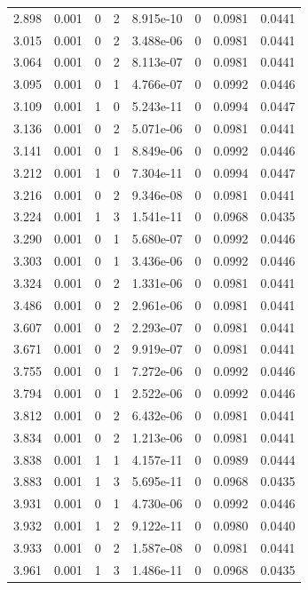 \documentclass[preview]{standalone}
\begin{document}
{{{\begin{tabular}{L{1.2cm}C{1.2cm} C{0.3cm}C{0.5cm} C{1.4cm}C{1.4cm} C{1.4cm}C{1.4cm}}
  2.898  &  0.001  & 0     &  2 &  8.915e-10  & 0  & 0.0981 &  0.0441   \\ 
  3.015  &  0.001  & 0     &  2 &  3.488e-06  & 0  & 0.0981 &  0.0441   \\ 
  3.064  &  0.001  & 0     &  2 &  8.113e-07  & 0  & 0.0981 &  0.0441   \\ 
  3.095  &  0.001  & 0     &  1 &  4.766e-07  & 0  & 0.0992 &  0.0446   \\ 
  3.109  &  0.001  & 1     &  0 &  5.243e-11  & 0  & 0.0994 &  0.0447   \\ 
  3.136  &  0.001  & 0     &  2 &  5.071e-06  & 0  & 0.0981 &  0.0441   \\ 
  3.141  &  0.001  & 0     &  1 &  8.849e-06  & 0  & 0.0992 &  0.0446   \\ 
  3.212  &  0.001  & 1     &  0 &  7.304e-11  & 0  & 0.0994 &  0.0447   \\ 
  3.216  &  0.001  & 0     &  2 &  9.346e-08  & 0  & 0.0981 &  0.0441   \\ 
  3.224  &  0.001  & 1     &  3 &  1.541e-11  & 0  & 0.0968 &  0.0435   \\ 
  3.290  &  0.001  & 0     &  1 &  5.680e-07  & 0  & 0.0992 &  0.0446   \\ 
  3.303  &  0.001  & 0     &  1 &  3.436e-06  & 0  & 0.0992 &  0.0446   \\ 
  3.324  &  0.001  & 0     &  2 &  1.331e-06  & 0  & 0.0981 &  0.0441   \\ 
  3.486  &  0.001  & 0     &  2 &  2.961e-06  & 0  & 0.0981 &  0.0441   \\ 
  3.607  &  0.001  & 0     &  2 &  2.293e-07  & 0  & 0.0981 &  0.0441   \\ 
  3.671  &  0.001  & 0     &  2 &  9.919e-07  & 0  & 0.0981 &  0.0441   \\ 
  3.755  &  0.001  & 0     &  1 &  7.272e-06  & 0  & 0.0992 &  0.0446   \\ 
  3.794  &  0.001  & 0     &  1 &  2.522e-06  & 0  & 0.0992 &  0.0446   \\ 
  3.812  &  0.001  & 0     &  2 &  6.432e-06  & 0  & 0.0981 &  0.0441   \\ 
  3.834  &  0.001  & 0     &  2 &  1.213e-06  & 0  & 0.0981 &  0.0441   \\ 
  3.838  &  0.001  & 1     &  1 &  4.157e-11  & 0  & 0.0989 &  0.0444   \\ 
  3.883  &  0.001  & 1     &  3 &  5.695e-11  & 0  & 0.0968 &  0.0435   \\ 
  3.931  &  0.001  & 0     &  1 &  4.730e-06  & 0  & 0.0992 &  0.0446   \\ 
  3.932  &  0.001  & 1     &  2 &  9.122e-11  & 0  & 0.0980 &  0.0440   \\ 
  3.933  &  0.001  & 0     &  2 &  1.587e-08  & 0  & 0.0981 &  0.0441   \\ 
  3.961  &  0.001  & 1     &  3 &  1.486e-11  & 0  & 0.0968 &  0.0435   \\ 
\hline 
\end{tabular} 

}}}
\end{document}
